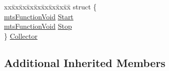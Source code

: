\begin{DoxyCompactItemize}
\begin{tabbing}
\end{tabbing}\item 
\begin{tabbing}
xx\=xx\=xx\=xx\=xx\=xx\=xx\=xx\=xx\=\kill
struct \{\\
\>\hyperlink{classmts_function_void}{mtsFunctionVoid} \hyperlink{classmts_n_d_i_serial_controller_qt_component_acd0453c56646442bb022c53cd8f7738b}{Start}\\
\>\hyperlink{classmts_function_void}{mtsFunctionVoid} \hyperlink{classmts_n_d_i_serial_controller_qt_component_a3b75ed63306a8e57ba4399da67b00813}{Stop}\\
\} \hyperlink{classmts_n_d_i_serial_controller_qt_component_a20fb8f5305cd429f41b741da4092ac7f}{Collector}\\

\end{tabbing}\end{DoxyCompactItemize}
\subsection*{Additional Inherited Members}


